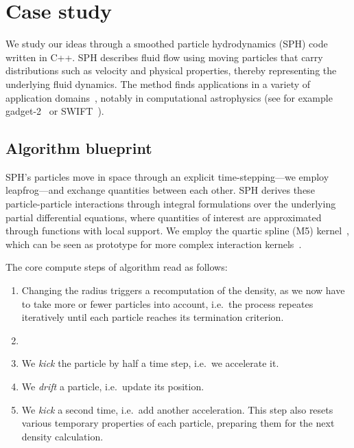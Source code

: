 \section{Case study}
\label{section:demonstrator}

We study our ideas through a smoothed particle hydrodynamics (SPH) code written in C++.
SPH describes fluid flow using moving particles that carry distributions such as velocity and physical properties, thereby representing the underlying fluid dynamics.
The method finds applications in a variety of application
domains~\cite{Lind:2020,Price:2012:SPH}, notably in computational astrophysics (see for example {\sc
gadget}-2~\cite{Springel-g2:2005} or SWIFT~\cite{Schaller:2024:Swift}).




\subsection{Algorithm blueprint}


SPH's particles move in space through an explicit time-stepping---we employ leapfrog---and exchange quantities between each other. 
SPH derives these particle-particle interactions through integral formulations over the underlying partial differential equations, where quantities of interest are approximated through functions with local support. 
We employ the quartic spline (M5) kernel~\cite{Monaghan:1985:Kernel}, which can be seen as prototype for more complex interaction kernels~\cite{Denhen:2012:SPHConvergence}.

The core compute steps of  algorithm  read as follows:


\begin{enumerate}
  \item {} Changing the radius triggers a 
  recomputation of the density, as we now have to take more or fewer particles into
  account, i.e.~the process repeates iteratively until each particle reaches
  its termination criterion.
  \item {}
  \item We \emph{kick} the particle by half a time step, i.e.~we accelerate it.
  \item We \emph{drift} a particle, i.e.~update its position.
  \item We \emph{kick} a second time, i.e.~add
  another acceleration. This step also resets various temporary properties of each particle, preparing them for the next density calculation.
\end{enumerate}


